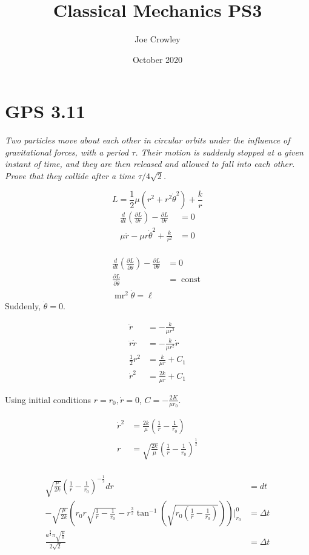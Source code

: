 \documentclass{article}
\title{Classical Mechanics  PS3}
\author{Joe Crowley}
\date{October 2020}
\begin{document}
  

\section{GPS 3.11}
\textit{Two particles move about each other in circular orbits under the influence of gravitational forces, with a period $\tau$. Their motion is suddenly stopped at a given instant of time, and they are then released and allowed to fall into each other. Prove that they collide after a time $\tau / 4 \sqrt{2}$.}


\begin{equation*}
    L=\frac{1}{2} \mu\left(r^{2}+r^{2} \dot{\theta}^{2}\right)+\frac{k}{r}
\end{equation*}
\begin{align*}
    \frac{d}{d t}\left(\frac{\partial L}{\partial \dot{r}}\right)-\frac{\partial L}{\partial r}&=0\\
    \mu \ddot{r}-\mu r \dot{\theta}^{2}+\frac{k}{r^{2}}&=0\\
\end{align*}

\begin{align*}
    \frac{d}{d t}\left(\frac{\partial L}{\partial \dot{\theta}}\right)-\frac{\partial L}{\partial \theta}&=0\\
    \frac{\partial L}{\partial \dot{\theta}}&=\operatorname{const}\\
    \operatorname{mr}^{2} \dot{\theta}=\ell
\end{align*}
Suddenly, $\dot{\theta}=0$. 

\begin{align*}
    \ddot{r}&=-\frac{k}{\mu r^{2}}\\
    \ddot{r} \dot{r}&=-\frac{k}{\mu r^{2}} \dot{r}\\
    \frac{1}{2} r^{2}&=\frac{k}{\mu r}+C_{1}\\
    \dot{r}^{2}&=\frac{2 k}{\mu r}+C_1
\end{align*}

Using initial conditions $r = r_0, \dot r = 0$, $C=-\frac{2 K}{\mu r_{0}}$.

\begin{align*}
    \dot{r}^{2}&=\frac{2 k}{\mu}\left(\frac{1}{r}-\frac{1}{r_{0}}\right)\\
    r&=\sqrt{\frac{2 k}{\mu}}\left(\frac{1}{r}-\frac{1}{r_{0}}\right)^{\frac{1}{2}}\\
\end{align*}

\begin{align*}
    \sqrt{\frac{\mu}{2 k}}\left(\frac{1}{r}-\frac{1}{r_{0}}\right)^{-\frac{1}{2}} d r&=dt\\
    -\sqrt{\frac{\mu}{2 k}}\left(r_{0} r \sqrt{\frac{1}{r}-\frac{1}{r_{0}}}-r^{\frac{3}{2}} \tan ^{-1}\left(\sqrt{r_0\left(\frac{1}{r}-\frac{1}{r_{0}}\right)}\right)\right)\Big|_{r_{0}} ^{0}&=\Delta t\\
    \frac{a^{\frac{3}{2}} \pi \sqrt{\frac{\mu}{k}}}{2 \sqrt{2}}&=\Delta t
\end{align*}
\end{document}
